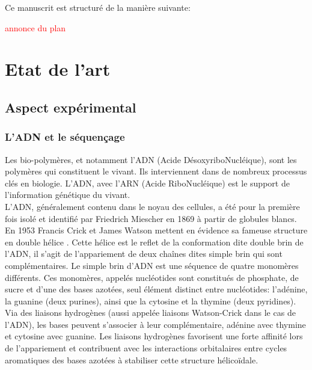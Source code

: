 \documentclass[a4paper,11pt]{article}
\begin{document}
Ce manuscrit est structuré de la manière suivante:


\textcolor{red}{annonce du plan}

\newpage

\tableofcontents



\newpage 

\section{Etat de l'art}

\subsection{Aspect expérimental}

\subsubsection{L'ADN et le séquençage}

Les bio-polymères, et notamment l'ADN (Acide DésoxyriboNucléique), sont les polymères qui constituent le vivant. Ils interviennent dans de nombreux processus clés en biologie.  L'ADN, avec l'ARN (Acide RiboNucléique) est le support de l'information génétique du vivant. \\

L'ADN, généralement contenu dans le noyau des cellules, a été pour la première fois isolé et identifié par Friedrich Miescher en 1869 à partir de globules blancs. En 1953  Francis Crick et James Watson mettent en évidence sa fameuse structure en double hélice \cite{watsoncrick}. Cette hélice est le reflet de la conformation dite double brin de l'ADN, il s'agit de l'appariement de deux chaînes dites simple brin qui sont complémentaires. Le simple brin d'ADN est une séquence de quatre monomères différents. Ces monomères, appelés nucléotides sont constitués de phosphate, de sucre et d'une des bases azotées, seul élément distinct entre nucléotides: l'adénine, la guanine (deux purines), ainsi que la cytosine et la thymine (deux pyridines). Via des liaisons hydrogènes (aussi appelée liaisons Watson-Crick dans le cas de l'ADN), les bases peuvent s'associer à leur complémentaire, adénine avec thymine et cytosine avec guanine. Les liaisons hydrogènes favorisent une forte affinité lors de l'appariement et contribuent avec les interactions orbitalaires entre cycles aromatiques des bases azotées à stabiliser cette structure hélicoïdale.
\end{document}
